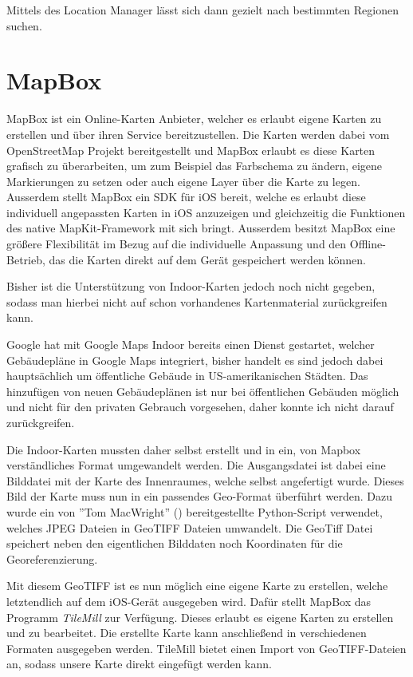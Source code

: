 Mittels des Location Manager lässt sich dann gezielt nach bestimmten Regionen suchen.


\section{MapBox}
\label{sec:sec:technologies:mapbox}
MapBox ist ein Online-Karten Anbieter, welcher es erlaubt eigene Karten zu erstellen und über ihren Service bereitzustellen. 
Die Karten werden dabei vom OpenStreetMap Projekt bereitgestellt und MapBox erlaubt es diese Karten grafisch zu überarbeiten, um zum Beispiel das Farbschema zu ändern, eigene Markierungen zu setzen oder auch eigene Layer über die Karte zu legen.
Ausserdem stellt MapBox ein SDK für iOS bereit, welche es erlaubt diese individuell angepassten Karten in iOS anzuzeigen und gleichzeitig die Funktionen des native MapKit-Framework mit sich bringt. Ausserdem besitzt MapBox eine größere Flexibilität im Bezug auf die individuelle Anpassung und den Offline-Betrieb, das die Karten direkt auf dem Gerät gespeichert werden können.

Bisher ist die Unterstützung von Indoor-Karten jedoch noch nicht gegeben, sodass man hierbei nicht auf schon vorhandenes Kartenmaterial zurückgreifen kann.

Google hat mit Google Maps Indoor bereits einen Dienst gestartet, welcher Gebäudepläne in Google Maps integriert, bisher handelt es sind jedoch dabei hauptsächlich um öffentliche Gebäude in US-amerikanischen Städten. Das hinzufügen von neuen Gebäudeplänen ist nur bei öffentlichen Gebäuden möglich und nicht für den privaten Gebrauch vorgesehen, daher konnte ich nicht darauf zurückgreifen.

Die Indoor-Karten mussten daher selbst erstellt und in ein, von Mapbox verständliches Format umgewandelt werden.
Die Ausgangsdatei ist dabei eine Bilddatei mit der Karte des Innenraumes, welche selbst angefertigt wurde. Dieses Bild der Karte muss nun in ein passendes Geo-Format überführt werden. 
Dazu wurde ein von ''Tom MacWright'' (\citet{jpgtogeo}) bereitgestellte Python-Script verwendet, welches JPEG Dateien in GeoTIFF Dateien umwandelt. Die GeoTiff Datei speichert neben den eigentlichen Bilddaten noch Koordinaten für die Georeferenzierung. \citet{geotiff}

Mit diesem GeoTIFF ist es nun möglich eine eigene Karte zu erstellen, welche letztendlich auf dem iOS-Gerät ausgegeben wird.
Dafür stellt MapBox das Programm \emph{TileMill} zur Verfügung. Dieses erlaubt es eigene Karten zu erstellen und zu bearbeitet. Die erstellte Karte kann anschließend in verschiedenen Formaten ausgegeben werden. 
TileMill bietet einen Import von GeoTIFF-Dateien an, sodass unsere Karte direkt eingefügt werden kann.

